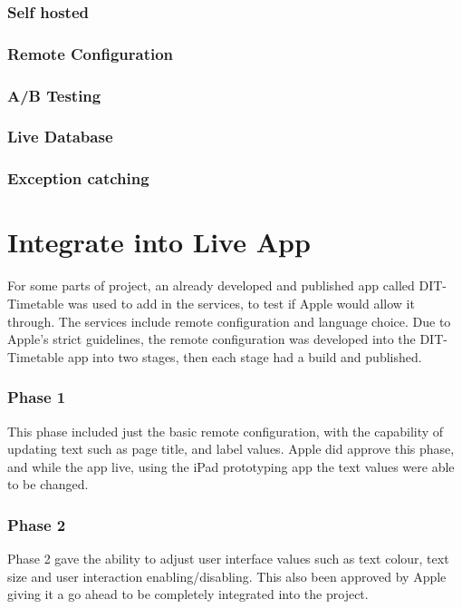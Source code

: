 \subsubsection{Self hosted}


\subsubsection{Remote Configuration}


\subsubsection{A/B Testing}


\subsubsection{Live Database}


\subsubsection{Exception catching}


\section{Integrate into Live App}

For some parts of project, an already developed and published app called DIT-Timetable was used to add in the services, to test if Apple would allow it through. The services include remote configuration and language choice. Due to Apple's strict guidelines, the remote configuration was developed into the DIT-Timetable app into two stages, then each stage had a build and published.

\subsubsection{Phase 1}
This phase included just the basic remote configuration, with the capability of updating text such as page title, and label values. Apple did approve this phase, and while the app live, using the iPad prototyping app the text values were able to be changed. 

\subsubsection{Phase 2}

Phase 2 gave the ability to adjust user interface values such as text colour, text size and user interaction enabling/disabling. This also been approved by Apple giving it a go ahead to be completely integrated into the project.  


